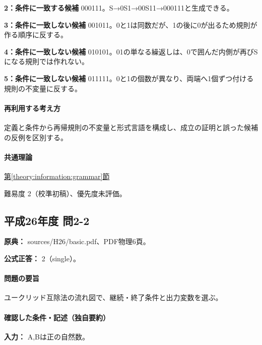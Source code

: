 \noindent\textbf{2：条件に一致する候補} 000111。S→0S1→00S11→000111と生成できる。\par

\noindent\textbf{3：条件に一致しない候補} 001011。0と1は同数だが、1の後に0が出るため規則が作る順序に反する。\par

\noindent\textbf{4：条件に一致しない候補} 010101。01の単なる繰返しは、0で囲んだ内側が再びSになる規則では作れない。\par

\noindent\textbf{5：条件に一致しない候補} 011111。0と1の個数が異なり、両端へ1個ずつ付ける規則の不変量に反する。\par

\paragraph{再利用する考え方} 定義と条件から再帰規則の不変量と形式言語を構成し、成立の証明と誤った候補の反例を区別する。

\paragraph{共通理論} \hyperref[theory:information:grammar]{第\ref*{theory:information:grammar}節}

\par 難易度 2（校準初稿）、優先度未評価。

\subsection{平成26年度 問2-2}
\label{q:h26-reg-basic-2-2}

\noindent\textbf{原典：} sources/H26/basic.pdf、PDF物理6頁。

\textbf{公式正答：} 2（single）。

\paragraph{問題の要旨} ユークリッド互除法の流れ図で、継続・終了条件と出力変数を選ぶ。

\paragraph{確認した条件・記述（独自要約）}\mbox{}\par

\noindent\textbf{入力：} A,Bは正の自然数。\par

